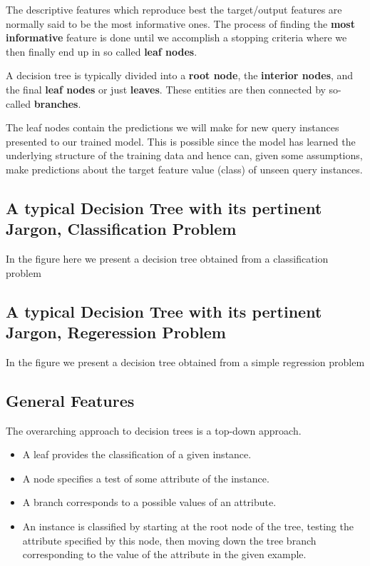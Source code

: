 \documentclass[%
oneside,                 %
final,                   %
10pt]{article}
\begin{document}
The descriptive features which reproduce best the target/output features are normally  said
to be the most informative ones. The process of finding the \textbf{most
informative} feature is done until we accomplish a stopping criteria
where we then finally end up in so called \textbf{leaf nodes}. 

A decision tree is typically divided into a \textbf{root node}, the \textbf{interior nodes},
and the final \textbf{leaf nodes} or just \textbf{leaves}. These entities are then connected by so-called \textbf{branches}.

The leaf nodes
contain the predictions we will make for new query instances presented
to our trained model. This is possible since the model has 
learned the underlying structure of the training data and hence can,
given some assumptions, make predictions about the target feature value
(class) of unseen query instances.

\subsection{A typical Decision Tree with its pertinent Jargon, Classification Problem}

In the figure here we present a decision tree obtained from a classification problem


\subsection{A typical Decision Tree with its pertinent Jargon, Regeression Problem}

In the figure we present a decision tree obtained from a simple regression  problem


\subsection{General Features}

The overarching approach to decision trees is a top-down approach.

\begin{itemize}
\item A leaf provides the classification of a given instance.

\item A node specifies a test of some attribute of the instance.

\item A branch corresponds to a possible values of an attribute.

\item An instance is classified by starting at the root node of the tree, testing the attribute specified by this node, then moving down the tree branch corresponding to the value of the attribute in the given example.
\end{itemize}
\end{document}
